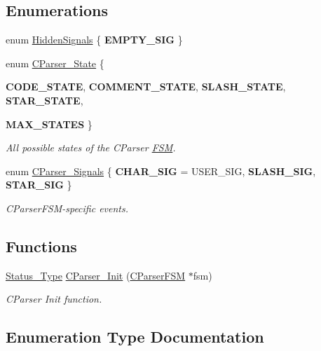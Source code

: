 \subsection*{Enumerations}
\begin{DoxyCompactItemize}
\item 
enum \hyperlink{group___c_parser_ga9f2e0737608155a8882726332068ca89}{HiddenSignals} \{ {\bfseries EMPTY\_\-SIG}
 \}
\item 
enum \hyperlink{group___c_parser_ga5ccffdf5b5411f5458cc65c8acce9cfa}{CParser\_\-State} \{ \par
{\bfseries CODE\_\-STATE}, 
{\bfseries COMMENT\_\-STATE}, 
{\bfseries SLASH\_\-STATE}, 
{\bfseries STAR\_\-STATE}, 
\par
{\bfseries MAX\_\-STATES}
 \}
\begin{DoxyCompactList}\small\item\em All possible states of the CParser \hyperlink{struct_f_s_m}{FSM}. \end{DoxyCompactList}\item 
enum \hyperlink{group___c_parser_ga635baa20a1a5f858397663df82358849}{CParser\_\-Signals} \{ {\bfseries CHAR\_\-SIG} =  USER\_\-SIG, 
{\bfseries SLASH\_\-SIG}, 
{\bfseries STAR\_\-SIG}
 \}
\begin{DoxyCompactList}\small\item\em CParserFSM-\/specific events. \end{DoxyCompactList}\end{DoxyCompactItemize}
\subsection*{Functions}
\begin{DoxyCompactItemize}
\item 
\hyperlink{group___f_s_m_ga3ef97600b5131dbf1b9a798e760e9268}{Status\_\-Type} \hyperlink{group___c_parser_gadc7edd159a43c4d49eac247a456763be}{CParser\_\-Init} (\hyperlink{struct_c_parser_f_s_m}{CParserFSM} $\ast$fsm)
\begin{DoxyCompactList}\small\item\em CParser Init function. \end{DoxyCompactList}\end{DoxyCompactItemize}


\subsection{Enumeration Type Documentation}
